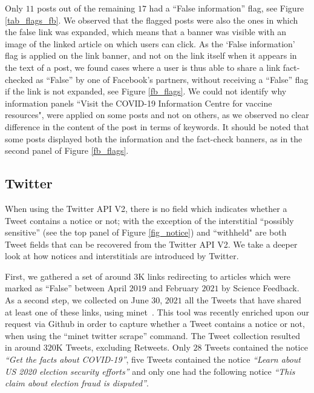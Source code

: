 \documentclass[Afour,sageh,times]{sagej}
\begin{document}
Only $11$ posts out of the remaining $17$ had a ``False information'' flag, see Figure \ref{tab_flags_fb}. 
We observed that the flagged posts were also the ones in which the false link was expanded, which means that a banner was visible with an image of the linked article on which users can click. 
As the ‘False information’ flag is applied on the link banner, and not on the link itself when it appears in the text of a post, we found cases where a user is thus able to share a link fact-checked as ``False''  by one of Facebook's partners, without receiving a ``False'' flag if the link is not expanded, see Figure \ref{fb_flags}.
We could not identify why information panels ``Visit the COVID-19 Information Centre for vaccine resources", were applied on some posts and not on others, as we observed no clear difference in the content of the post in terms of keywords. 
It should be noted that some posts displayed both the information and the fact-check banners, as in the second panel of Figure \ref{fb_flags}.

\subsection{Twitter} 

When using the Twitter API V2, there is no field which indicates whether a Tweet contains a notice or not; with the exception of the interstitial ``possibly sensitive'' (see the top panel of Figure \ref{fig_notice}) and ``withheld" are both Tweet fields that can be recovered from the Twitter API V2. 
We take a deeper look at how notices and interstitials are introduced by Twitter. 

First, we gathered a set of around $3$K  links redirecting to articles which were marked as ``False'' between April $2019$ and February $2021$ by Science Feedback. As a second step, we collected on June $30$, $2021$ all the Tweets that have shared at least one of these links, using minet~\cite{minet}. 
This tool was recently enriched upon our request via Github in order to capture whether a Tweet contains a notice or not, when using the ``minet twitter scrape'' command. 
The Tweet collection resulted in around $320$K Tweets, excluding Retweets. Only $28$ Tweets contained the notice { \it ``Get the facts about COVID-19''}, five Tweets contained the notice {\it ``Learn about US 2020 election security efforts''} and only one had the following notice {\it ``This claim about election fraud is disputed''}. 
\end{document}
